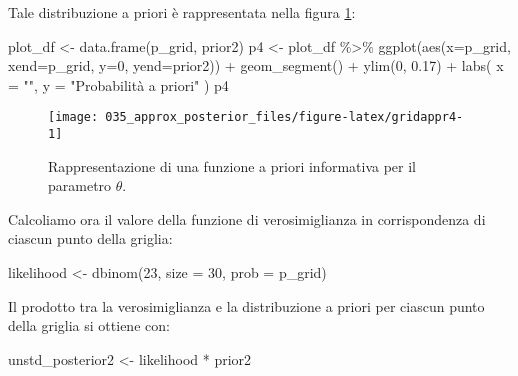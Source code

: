 \documentclass[
]{memoir}
\newenvironment{Shaded}{\begin{snugshade}}{\end{snugshade}}
\newcommand{\AttributeTok}[1]{\textcolor[rgb]{0.77,0.63,0.00}{#1}}
\newcommand{\DecValTok}[1]{\textcolor[rgb]{0.00,0.00,0.81}{#1}}
\newcommand{\FloatTok}[1]{\textcolor[rgb]{0.00,0.00,0.81}{#1}}
\newcommand{\FunctionTok}[1]{\textcolor[rgb]{0.00,0.00,0.00}{#1}}
\newcommand{\NormalTok}[1]{#1}
\newcommand{\OtherTok}[1]{\textcolor[rgb]{0.56,0.35,0.01}{#1}}
\newcommand{\SpecialCharTok}[1]{\textcolor[rgb]{0.00,0.00,0.00}{#1}}
\newcommand{\StringTok}[1]{\textcolor[rgb]{0.31,0.60,0.02}{#1}}
\begin{document}
\noindent
Tale distribuzione a priori è rappresentata nella figura \ref{fig:gridappr4}:

\begin{Shaded}
\begin{Highlighting}[]
\NormalTok{plot\_df }\OtherTok{\textless{}{-}} \FunctionTok{data.frame}\NormalTok{(p\_grid, prior2)}
\NormalTok{p4 }\OtherTok{\textless{}{-}}\NormalTok{ plot\_df }\SpecialCharTok{\%\textgreater{}\%}
  \FunctionTok{ggplot}\NormalTok{(}\FunctionTok{aes}\NormalTok{(}\AttributeTok{x=}\NormalTok{p\_grid, }\AttributeTok{xend=}\NormalTok{p\_grid, }\AttributeTok{y=}\DecValTok{0}\NormalTok{, }\AttributeTok{yend=}\NormalTok{prior2)) }\SpecialCharTok{+}
  \FunctionTok{geom\_segment}\NormalTok{() }\SpecialCharTok{+}
  \FunctionTok{ylim}\NormalTok{(}\DecValTok{0}\NormalTok{, }\FloatTok{0.17}\NormalTok{) }\SpecialCharTok{+}
  \FunctionTok{labs}\NormalTok{(}
    \AttributeTok{x =} \StringTok{""}\NormalTok{,}
    \AttributeTok{y =} \StringTok{"Probabilità a priori"}
\NormalTok{  )}
\NormalTok{p4}
\end{Highlighting}
\end{Shaded}

\begin{figure}

{\centering \texttt{[image: 035\_approx\_posterior\_files/figure-latex/gridappr4-1]} 

}

\caption{Rappresentazione di una funzione a priori informativa per il parametro $\theta$.}\label{fig:gridappr4}
\end{figure}

\noindent
Calcoliamo ora il valore della funzione di verosimiglianza in corrispondenza di ciascun punto della griglia:

\begin{Shaded}
\begin{Highlighting}[]
\NormalTok{likelihood }\OtherTok{\textless{}{-}} \FunctionTok{dbinom}\NormalTok{(}\DecValTok{23}\NormalTok{, }\AttributeTok{size =} \DecValTok{30}\NormalTok{, }\AttributeTok{prob =}\NormalTok{ p\_grid)}
\end{Highlighting}
\end{Shaded}

\noindent
Il prodotto tra la verosimiglianza e la distribuzione a priori per ciascun punto della griglia si ottiene con:

\begin{Shaded}
\begin{Highlighting}[]
\NormalTok{unstd\_posterior2 }\OtherTok{\textless{}{-}}\NormalTok{ likelihood }\SpecialCharTok{*}\NormalTok{ prior2}
\end{Highlighting}
\end{Shaded}
\end{document}
